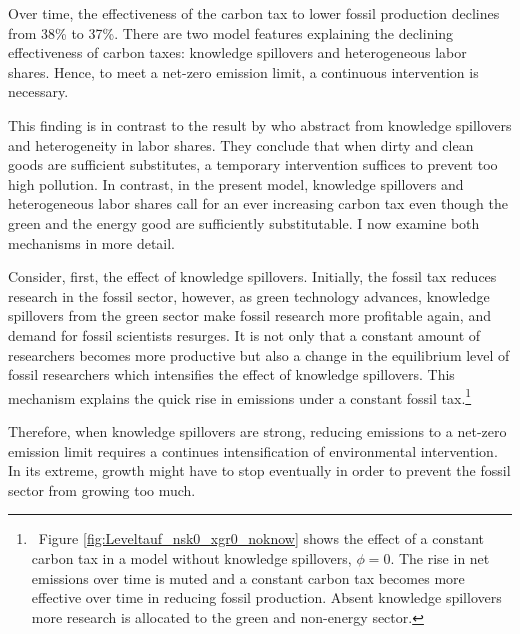 Over time, the effectiveness of the carbon tax to lower fossil production declines from 38\% to 37\%. There are two model features explaining the declining effectiveness of carbon taxes: knowledge spillovers and heterogeneous labor shares. Hence, to meet a net-zero emission limit, a continuous intervention is necessary. 

This finding is in contrast to the result by \cite{Acemoglu2012TheChange} who abstract from knowledge spillovers and heterogeneity in labor shares. They conclude that when dirty and clean goods are sufficient substitutes, a temporary intervention suffices to prevent too high pollution. In contrast, in the present model, knowledge spillovers and heterogeneous labor shares 
call for an ever increasing carbon tax even though the green and the energy good are sufficiently substitutable. I now examine both mechanisms in more detail.

Consider, first, the effect of knowledge spillovers.
Initially, the fossil tax reduces research in the fossil sector, however, as green technology advances, knowledge spillovers from the green sector make fossil research more profitable again, and demand for fossil scientists resurges.
It is not only that a constant amount of researchers becomes more productive but also a change in the equilibrium level of fossil researchers which intensifies the effect of knowledge spillovers. This mechanism explains the quick rise in emissions under a constant fossil tax.\footnote{\ Figure \ref{fig:Leveltauf_nsk0_xgr0_noknow} shows the effect of a constant carbon tax in a model without knowledge spillovers, $\phi=0$. The rise in net emissions over time is muted and a constant carbon tax becomes more effective over time in reducing fossil production.  Absent knowledge spillovers more research is allocated to the green and non-energy sector.} 

Therefore, when knowledge spillovers are strong, reducing emissions to a net-zero emission limit requires a continues intensification of environmental intervention. In its extreme, growth might have to stop eventually in order to prevent the fossil sector from growing too much.

